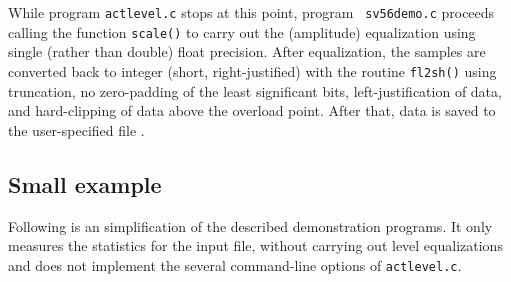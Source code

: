 While program {\tt actlevel.c} stops at this point, program {\tt
sv56demo.c} proceeds calling the function {\tt scale()} to carry out
the (amplitude) equalization using single (rather than double) float
precision. After equalization, the samples are converted back to
integer (short, right-justified) with the routine {\tt fl2sh()} using
truncation, no zero-padding of the least significant bits,
left-justification of data, and hard-clipping of data above the
overload point. After that, data is saved to the user-specified file .


\subsection {Small example}

Following is an simplification of the described demonstration programs. It
only measures the statistics for the input file, without carrying out
level equalizations and does not implement the several command-line
options of  {\tt actlevel.c}.

